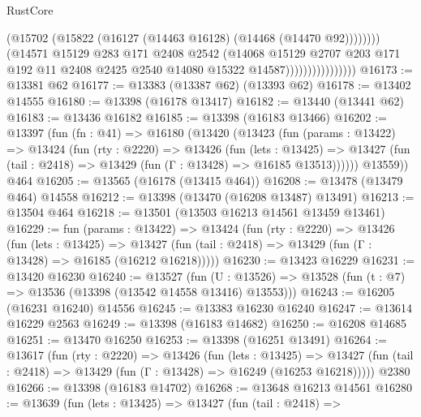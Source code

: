 \begin{lexlean}{RustCore}
\begin{coremodule}
                                      (@15702
                                        (@15822 (@16127 (@14463 @16128) (@14468 (@14470 @92))))))))
                                (@14571
                                  @15129
                                  @283
                                  @171
                                  @2408
                                  @2542
                                  (@14068
                                    @15129
                                    @2707
                                    @203
                                    @171
                                    @192
                                    @11
                                    @2408
                                    @2425
                                    @2540
                                    @14080
                                    @15322
                                    @14587))))))))))))))))
@16173 := @13381 @62
@16177 := @13383 (@13387 @62) (@13393 @62)
@16178 := @13402 @14555
@16180 := @13398 (@16178 @13417)
@16182 := @13440 (@13441 @62)
@16183 := @13436 @16182
@16185 := @13398 (@16183 @13466)
@16202 := @13397
    (fun (fn : @41) =>
    @16180
      (@13420
        (@13423
          (fun (params : @13422) =>
          @13424
            (fun (rty : @2220) =>
            @13426
              (fun (lets : @13425) =>
              @13427 (fun (tail : @2418) => @13429 (fun (Γ : @13428) => @16185 @13513))))))
        @13559))
    @464
@16205 := @13565 (@16178 (@13415 @464))
@16208 := @13478 (@13479 @464) @14558
@16212 := @13398 (@13470 (@16208 @13487) @13491)
@16213 := @13504 @464
@16218 := @13501 (@13503 @16213 @14561 @13459 @13461)
@16229 := fun (params : @13422) =>
  @13424
    (fun (rty : @2220) =>
    @13426
      (fun (lets : @13425) =>
      @13427 (fun (tail : @2418) => @13429 (fun (Γ : @13428) => @16185 (@16212 @16218)))))
@16230 := @13423 @16229
@16231 := @13420 @16230
@16240 := @13527
    (fun (U : @13526) => @13528 (fun (t : @7) => @13536 (@13398 (@13542 @14558 @13416) @13553)))
@16243 := @16205 (@16231 @16240) @14556
@16245 := @13383 @16230 @16240
@16247 := @13614 @16229 @2563
@16249 := @13398 (@16183 @14682)
@16250 := @16208 @14685
@16251 := @13470 @16250
@16253 := @13398 (@16251 @13491)
@16264 := @13617
    (fun (rty : @2220) =>
    @13426
      (fun (lets : @13425) =>
      @13427 (fun (tail : @2418) => @13429 (fun (Γ : @13428) => @16249 (@16253 @16218)))))
    @2380
@16266 := @13398 (@16183 @14702)
@16268 := @13648 @16213 @14561
@16280 := @13639
    (fun (lets : @13425) =>
    @13427
      (fun (tail : @2418) =>

\end{coremodule}
\end{lexlean}
